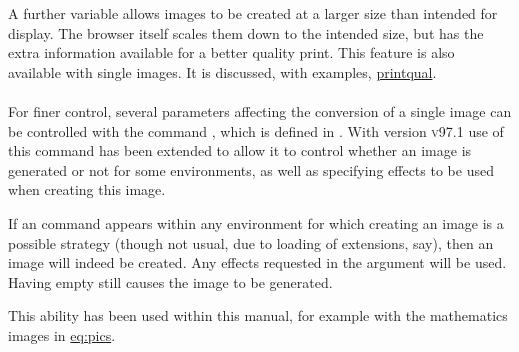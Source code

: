 %
%
\html{\\}%

A further variable  allows images to be created
at a larger size than intended for display. 
The browser itself scales them down to the intended size, 
but has the extra information available for a better quality print. 
This feature is also available with single images. It is discussed, 
with examples, \hyperref{on the next page}{in Section~}{}{printqual}.


%
%
%
\paragraph*{\texttt{}\label{htmlimage}}
%
For finer control, several parameters affecting the conversion 
of a single image can be controlled
with the command , which is defined in .
With version \textsc{v97.1} use of this command has been extended to allow
it to control whether an image is generated or not
for some environments,
as well as specifying effects to be used when creating this image.

If an  command appears within any environment
for which creating an image is a possible strategy (though not usual,
due to loading of extensions, say), then an image will indeed be
created. Any effects requested in the  argument will be used.
Having empty  still causes the image to be generated.

This ability has been used within this manual, for example with the
mathematics images in \hyperref{the previous section}{Figure~}{}{eq:pics}.

